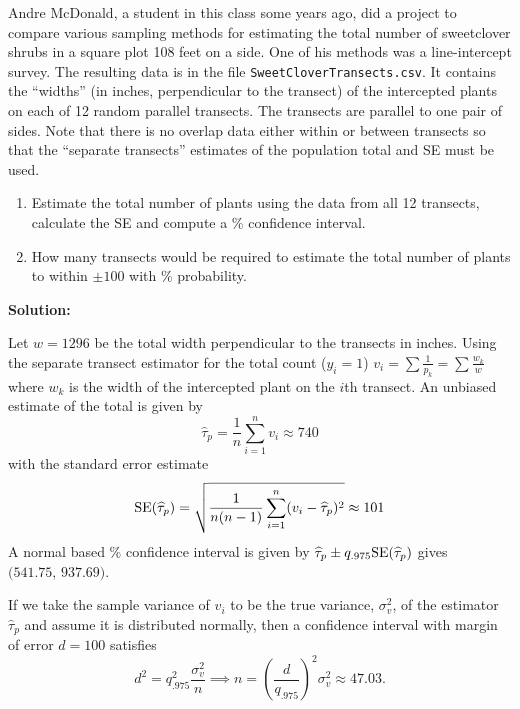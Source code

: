 \documentclass[usenames,dvipsnames]{homework}
\begin{document}
\begin{longproblem}
  Andre McDonald, a student in this class some years ago, did a project to compare various sampling methods for estimating the total number of sweetclover shrubs in a square plot 108 feet on a side.  One of his methods was a line-intercept survey.  The resulting data is in the file \texttt{SweetCloverTransects.csv}.  It contains the ``widths'' (in inches, perpendicular to the transect) of the intercepted plants on each of 12 random parallel transects.  The transects are parallel to one pair of sides.  Note that there is no overlap data either within or between transects so that the ``separate transects'' estimates of the population total and SE must be used.
\begin{enumerate} 
  \item Estimate the total number of plants using the data from all 12 transects, calculate the SE and compute a \unit[95]{\%} confidence interval.
  \item How many transects would be required to estimate the total number of plants to within $\pm 100$ with \unit[95]{\%} probability.
\end{enumerate}

{\bf Solution:}

  Let $w=1296$ be the total width perpendicular to the transects in inches. Using the separate transect estimator for the total count ($y_i = 1$) $v_i = \sum \frac{1}{p_k} = \sum \frac{w_k}{w}$ where $w_k$ is the width of the intercepted plant on the $i$th transect. An unbiased estimate of the total is given by 
  $$
    \hat\tau_p = \frac 1n \sum_{i=1}^n v_i \approx 740
  $$
  with the standard error estimate
  $$
    \mathrm{SE}(\widehat\tau_p) = \sqrt{\frac 1{n(n-1)} \sum_{i=1}^n (v_i - \widehat\tau_p)^2} \approx 101
  $$
  A normal based \unit[95]{\%} confidence interval is given by $\widehat\tau_p \pm q_{.975} \mathrm{SE}(\widehat\tau_p) $ gives $\big(541.75,\, 937.69 \big) $.


  If we take the sample variance of $v_i$ to be the true variance, $\sigma_v^2$, of the estimator $\hat\tau_p$ and assume it is distributed normally, then a confidence interval with margin of error $d=100$ satisfies
  $$ 
  d^2 = q_{.975}^2 \frac{\sigma_v^2}{n} \implies n = \left(\frac d{q_{.975}}\right)^2 \sigma_v^2 \approx 47.03.
  $$
\end{longproblem}

\vspace{-3em}
\end{document}
